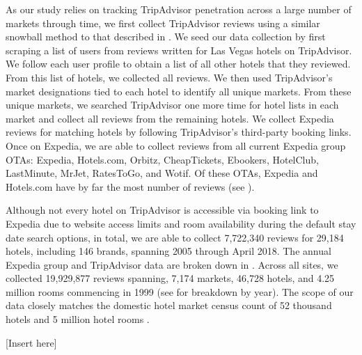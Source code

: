 \documentclass[mksc,blindrev]{informs3} %
\begin{document}
As our study relies on tracking TripAdvisor penetration across a large number of markets through time, we first collect TripAdvisor reviews using a similar snowball method to that described in \citet{wang2018and}. We seed our data collection by first scraping a list of users from reviews written for Las Vegas hotels on TripAdvisor. We follow each user profile to obtain a list of all other hotels that they reviewed. From this list of hotels, we collected all reviews. We then used TripAdvisor's market designations tied to each hotel to identify all unique markets. From these unique markets, we searched TripAdvisor one more time for hotel lists in each market and collect all reviews from the remaining hotels. We collect Expedia reviews for matching hotels by following TripAdvisor's third-party booking links. Once on Expedia, we are able to collect reviews from all current Expedia group OTAs: Expedia, Hotels.com, Orbitz, CheapTickets, Ebookers, HotelClub, LastMinute, MrJet, RatesToGo, and Wotif. Of these OTAs, Expedia and Hotels.com have by far the most number of reviews (see ).

Although not every hotel on TripAdvisor is accessible via booking link to Expedia due to website access limits and room availability during the default stay date search options, in total, we are able to collect 7,722,340 reviews for 29,184 hotels, including 146 brands, spanning 2005 through April 2018. The annual Expedia group and TripAdvisor data are broken down in . Across all sites, we collected 19,929,877 reviews spanning, 7,174 markets, 46,728 hotels, and 4.25 million rooms commencing in 1999 (see  for breakdown by year). The scope of our data closely matches the domestic hotel market census count of 52 thousand hotels and 5 million hotel rooms \citep{hotelnews2015}. 


[Insert  here]
\end{document}
